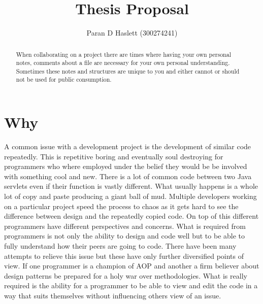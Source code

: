 \documentclass[12pt]{CRPITStyle}
\begin{document}
\title{Thesis Proposal}
\author{Paran D Haslett (300274241)}
\maketitle

\begin{abstract}
When collaborating on a project there are times where having your own personal notes, comments about a file are necessary for your own personal understanding.  Sometimes these notes and structures are unique to you and either cannot or should not be used for public consumption. 
\end{abstract}
\vspace{.1in}


\section{Why}
A common issue with a development project is the development of similar code repeatedly.  This is repetitive boring and eventually soul destroying for programmers who where employed under the belief they would be be involved with something cool and new. There is a lot of common code between two Java servlets even if their function is vastly different. What usually happens is a whole lot of copy and paste producing a giant ball of mud.  Multiple developers working on a particular project speed the process to chaos as it gets hard to see the difference between design and the repeatedly copied code.  On top of this different programmers have different perspectives and concerns.  What is required from programmers is not only the ability to design and code well but to be able to fully understand how their peers are going to code.  There have been many attempts to relieve this issue but these have only further diversified points of view.  If one programmer is a champion of AOP and another a firm believer about design patterns be prepared for a holy war over methodologies.  What is really required is the ability for a programmer to be able to view and edit the code in a way that suits themselves without influencing others view of an issue. 

{}

\end{document}
